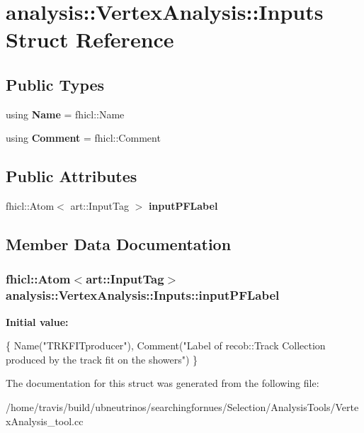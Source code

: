 \hypertarget{structanalysis_1_1VertexAnalysis_1_1Inputs}{}\section{analysis\+:\+:Vertex\+Analysis\+:\+:Inputs Struct Reference}
\label{structanalysis_1_1VertexAnalysis_1_1Inputs}
\subsection*{Public Types}
\begin{DoxyCompactItemize}
\item 
using {\bfseries Name} = fhicl\+::\+Name\hypertarget{structanalysis_1_1VertexAnalysis_1_1Inputs_a6a16430e651849ddf13e468abd433816}{}\label{structanalysis_1_1VertexAnalysis_1_1Inputs_a6a16430e651849ddf13e468abd433816}

\item 
using {\bfseries Comment} = fhicl\+::\+Comment\hypertarget{structanalysis_1_1VertexAnalysis_1_1Inputs_aba872ec29f22a91e6e7f46acf9e4d34d}{}\label{structanalysis_1_1VertexAnalysis_1_1Inputs_aba872ec29f22a91e6e7f46acf9e4d34d}

\end{DoxyCompactItemize}
\subsection*{Public Attributes}
\begin{DoxyCompactItemize}
\item 
fhicl\+::\+Atom$<$ art\+::\+Input\+Tag $>$ {\bfseries input\+P\+F\+Label}
\end{DoxyCompactItemize}


\subsection{Member Data Documentation}
\subsubsection[{\texorpdfstring{input\+P\+F\+Label}{inputPFLabel}}]{\setlength{\rightskip}{0pt plus 5cm}fhicl\+::\+Atom$<$art\+::\+Input\+Tag$>$ analysis\+::\+Vertex\+Analysis\+::\+Inputs\+::input\+P\+F\+Label}\hypertarget{structanalysis_1_1VertexAnalysis_1_1Inputs_a496073c250cd01fe370ec1ff165bd48d}{}\label{structanalysis_1_1VertexAnalysis_1_1Inputs_a496073c250cd01fe370ec1ff165bd48d}
{\bfseries Initial value\+:}
\begin{DoxyCode}
\{
      Name(\textcolor{stringliteral}{"TRKFITproducer"}),
      Comment(\textcolor{stringliteral}{"Label of recob::Track Collection produced by the track fit on the showers"})
    \}
\end{DoxyCode}


The documentation for this struct was generated from the following file\+:\begin{DoxyCompactItemize}
\item 
/home/travis/build/ubneutrinos/searchingfornues/\+Selection/\+Analysis\+Tools/Vertex\+Analysis\+\_\+tool.\+cc\end{DoxyCompactItemize}
